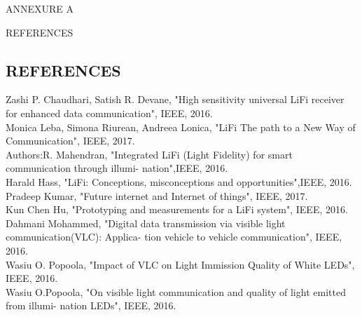 \documentclass[12pt,a4paper]
{article}
\numberwithin{table}{section}
\begin{document}
{{{{{{{{{%
\begin{appendices}
\newpage
\begin{minipage}{18cm}


\vspace{4 in}
 \begin{center} 
\begin{Huge}

ANNEXURE A

\vspace{0.5 in}
REFERENCES
\end{Huge}

\end{center}
\end{minipage}
\newpage
\newpage
\begin{center}
\section{REFERENCES }
\end{center}


\hspace{[1]} Zashi P. Chaudhari, Satish R. Devane, "High sensitivity universal LiFi receiver for enhanced data communication", IEEE, 2016.\\
\hspace{[2]} Monica Leba, Simona Riurean, Andreea Lonica, "LiFi The path to a New Way of Communication", IEEE, 2017. \\
\hspace{[3]} Authors:R. Mahendran, "Integrated LiFi (Light Fidelity) for smart communication through illumi-
nation",IEEE,  2016.\\
\hspace{[4]} Harald Hass, "LiFi: Conceptions, misconceptions and opportunities",IEEE,  2016.\\
\hspace{[5]} Pradeep Kumar, "Future internet and Internet of things", IEEE, 2017.\\
\hspace{[6]} Kun Chen Hu, "Prototyping and measurements for a LiFi system", IEEE, 2016.\\
\hspace{[7]} Dahmani Mohammed, "Digital data transmission via visible light communication(VLC): Applica-
tion vehicle to vehicle communication", IEEE, 2016.\\
\hspace{[8]} Wasiu O. Popoola, "Impact of VLC on Light Immission Quality of White LEDs", IEEE, 2016.\\
\hspace{[9]} Wasiu O.Popoola, "On visible light communication and quality of light emitted from illumi-
nation LEDs", IEEE, 2016.\\



\end{appendices}}}}}}}}}}
\end{document}
